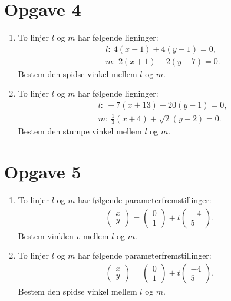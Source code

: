 \section*{Opgave 4}

\begin{enumerate}[label=\roman*)]
	\item To linjer $l$ og $m$ har følgende ligninger:
	\begin{align*}
		&l: \	4(x-1) + 4(y-1) =0,\\
		&m: \ 2(x+1) -2(y-7) = 0.
	\end{align*}	 
	Bestem den spidse vinkel mellem $l$ og $m$. 
	\item To linjer $l$ og $m$ har følgende ligninger:
	\begin{align*}
		&l: \ -7(x+13) - 20(y-1) = 0,\\
		&m: \ \frac{1}{3}(x+4) + \sqrt{2}(y-2) = 0.
	\end{align*}
	Bestem den stumpe vinkel mellem $l$ og $m$. 
\end{enumerate}

\section*{Opgave 5}
\begin{enumerate}[label=\roman*)]
	\item To linjer $l$ og $m$ har følgende parameterfremstillinger:
	\begin{align*}
		\begin{pmatrix}
			x \\ y
		\end{pmatrix}=
		\begin{pmatrix}
			0 \\ 1
		\end{pmatrix}+ t
		\begin{pmatrix}
			-4 \\ 5
		\end{pmatrix}.
	\end{align*}
	Bestem vinklen $v$ mellem $l$ og $m$. 
	
	\item To linjer $l$ og $m$ har følgende parameterfremstillinger:
	\begin{align*}
		\begin{pmatrix}
			x \\ y
		\end{pmatrix}=
		\begin{pmatrix}
			0 \\ 1
		\end{pmatrix}+ t
		\begin{pmatrix}
			-4 \\ 5
		\end{pmatrix}.
	\end{align*}
	Bestem den spidse vinkel mellem $l$ og $m$. 
\end{enumerate}

